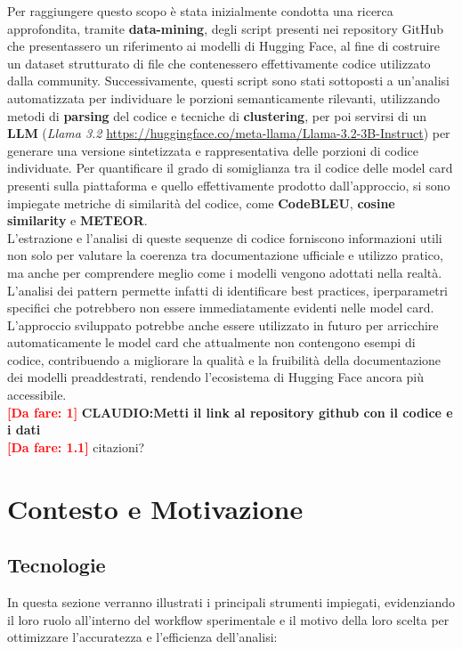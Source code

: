\documentclass{article}
\newcommand{\dafare}[1]{\textbf{\textcolor{red}{[Da fare: #1]}}}
\begin{document}
Per raggiungere questo scopo è stata inizialmente condotta una ricerca approfondita, tramite \textbf{data-mining}, degli script presenti nei repository GitHub che presentassero un riferimento ai modelli di Hugging Face, al fine di costruire un dataset strutturato di file che contenessero effettivamente codice utilizzato dalla community. Successivamente, questi script sono stati sottoposti a un’analisi automatizzata per individuare le porzioni semanticamente rilevanti, utilizzando metodi di \textbf{parsing} del codice e tecniche di \textbf{clustering}, per poi servirsi di un \textbf{LLM} (\textit{Llama 3.2} \url{https://huggingface.co/meta-llama/Llama-3.2-3B-Instruct})  per generare una versione sintetizzata e rappresentativa delle porzioni di codice individuate. Per quantificare il grado di somiglianza tra il codice delle model card presenti sulla piattaforma e quello effettivamente prodotto dall'approccio, si sono impiegate metriche di similarità del codice, come \textbf{CodeBLEU}, \textbf{cosine similarity} e \textbf{METEOR}.\\
L’estrazione e l’analisi di queste sequenze di codice forniscono informazioni utili non solo per valutare la coerenza tra documentazione ufficiale e utilizzo pratico, ma anche per comprendere meglio come i modelli vengono adottati nella realtà. L’analisi dei pattern permette infatti di identificare best practices, iperparametri specifici che potrebbero non essere immediatamente evidenti nelle model card.\\
L’approccio sviluppato potrebbe anche essere utilizzato in futuro per arricchire automaticamente le model card che attualmente non contengono esempi di codice, contribuendo a migliorare la qualità e la fruibilità della documentazione dei modelli preaddestrati, rendendo l’ecosistema di Hugging Face ancora più accessibile.\\
\dafare{1}
\textbf{CLAUDIO:Metti il link al repository github con il codice e i dati}\\
\dafare{1.1}
citazioni?


\section{Contesto e Motivazione}
\subsection{Tecnologie}
In questa sezione verranno illustrati i principali strumenti impiegati, evidenziando il loro ruolo all'interno del workflow sperimentale e il motivo della loro scelta per ottimizzare l'accuratezza e l'efficienza dell’analisi:
\end{document}
